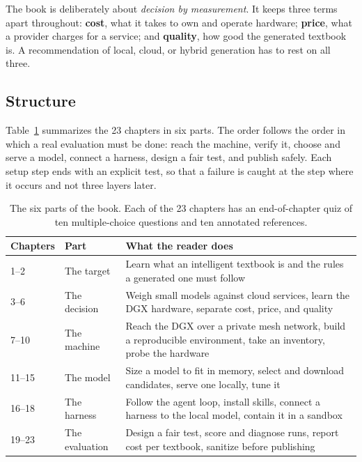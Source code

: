 \documentclass[11pt]{article}
\begin{document}
The book is deliberately about \textit{decision by measurement}. It keeps three terms apart throughout: \textbf{cost}, what it takes to own and operate hardware; \textbf{price}, what a provider charges for a service; and \textbf{quality}, how good the generated textbook is. A recommendation of local, cloud, or hybrid generation has to rest on all three.

\subsection{Structure}

Table~\ref{tab:parts} summarizes the 23 chapters in six parts. The order follows the order in which a real evaluation must be done: reach the machine, verify it, choose and serve a model, connect a harness, design a fair test, and publish safely. Each setup step ends with an explicit test, so that a failure is caught at the step where it occurs and not three layers later.

\begin{table}[htbp]
\centering
\small
\begin{tabularx}{\textwidth}{@{}llX@{}}
\toprule
\textbf{Chapters} & \textbf{Part} & \textbf{What the reader does} \\
\midrule
1--2 & The target & Learn what an intelligent textbook is and the rules a generated one must follow \\
3--6 & The decision & Weigh small models against cloud services, learn the DGX hardware, separate cost, price, and quality \\
7--10 & The machine & Reach the DGX over a private mesh network, build a reproducible environment, take an inventory, probe the hardware \\
11--15 & The model & Size a model to fit in memory, select and download candidates, serve one locally, tune it \\
16--18 & The harness & Follow the agent loop, install skills, connect a harness to the local model, contain it in a sandbox \\
19--23 & The evaluation & Design a fair test, score and diagnose runs, report cost per textbook, sanitize before publishing \\
\bottomrule
\end{tabularx}
\caption{The six parts of the book. Each of the 23 chapters has an end-of-chapter quiz of ten multiple-choice questions and ten annotated references.}
\label{tab:parts}
\end{table}
\end{document}
